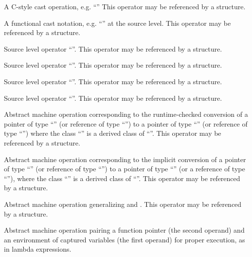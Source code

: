 A C-style cast operation, e.g. ``''
This operator may be referenced by a  structure.

A functional cast notation, e.g. ``'' at the source level.
This operator may be referenced by a  structure.

Source level operator ``''.
This operator may be referenced by a  structure.

Source level operator ``''.
This operator may be referenced by a  structure.


Source level operator ``''.
This operator may be referenced by a  structure.

Source level operator ``''.
This operator may be referenced by a  structure.

Abstract machine operation corresponding to the runtime-checked conversion of a pointer of type ``'' 
(or reference of type ``'') to a pointer of type ``'' (or reference of type ``'')
where the class ``'' is a derived class of ``''.
This operator may be referenced by a  structure.

Abstract machine operation corresponding to the implicit conversion of a pointer of type ``'' (or 
reference of type ``'') to a pointer of type ``'' (or a reference of type ``''),
where the class ``'' is a derived class of ``''.
This operator may be referenced by a  structure.

Abstract machine operation generalizing  and .
This operator may be referenced by a  structure.

Abstract machine operation pairing a function pointer (the second operand) and an environment of captured variables (the first operand) 
for proper execution, as in lambda expressions.

